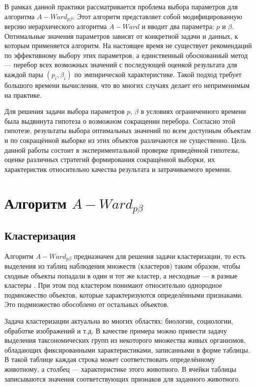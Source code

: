 \documentclass[12pt,twoside,a4paper,tikz,border=5]{refart}
\begin{document}
		В рамках данной практики рассматривается проблема выбора параметров для алгоритма $ A-Ward_{p\beta} $. Этот алгоритм представляет собой модифицированную версию иерархического алгоритма $ A-Ward $ и вводит два параметра: $ p $ и $ \beta $. Оптимальные значения параметров зависят от конкретной задачи и данных, к которым применяется алгоритм. На настоящее время не существует рекомендаций по эффективному выбору этих параметров, а единственный обоснованный метод --- перебор всех возможных значений с последующей оценкой результата для каждой пары $ (p_i,\beta_i) $  по эмпирической характеристике. Такой подход требует большого времени вычисления, что во многих случаях делает его неприменимым на практике.
		
		Для решения задачи выбора параметров $ p$, $\beta $ в условиях ограниченного времени была выдвинута гипотеза о возможном сокращении перебора. Согласно этой гипотезе, результаты выбора оптимальных значений по всем доступным объектам и по сокращённой выборке из этих объектов различаются не существенно. Цель данной работы состоит в экспериментальной проверке приведённой гипотезы, оценке различных стратегий формирования сокращённой выборки, их характеристик относительно качества результата и затрачиваемого времени.
	
	\section{Алгоритм $ A-Ward_{p\beta} $}
		\subsection{Кластеризация}
			Алгоритм $ A-Ward_{p\beta} $ предназначен для решения задачи кластеризации, то есть выделения из таблиц наблюдения множеств (кластеров) таким образом, чтобы сходные объекты попадали в один и тот же кластер, а несходные --- в разные кластеры \cite{mirkin-ds}. При этом под кластером понимают относительно однородное подмножество объектов, которые характеризуются определёнными признаками. Это подмножество обособлено от остальных объектов.
			
			Задача кластеризации актуальна во многих областях: биологии, социологии, обработке изображений и т.д.
			В качестве примера можно привести задачу выделения таксономических групп из некоторого множества живых организмов, обладающих фиксированными характеристиками, записанными в форме таблицы. В такой таблице каждая строка может соответствовать определённому животному, а столбец --- характеристике этого животного. В ячейки таблицы записываются значения соответствующих признаков для заданного животного. 
\end{document}
